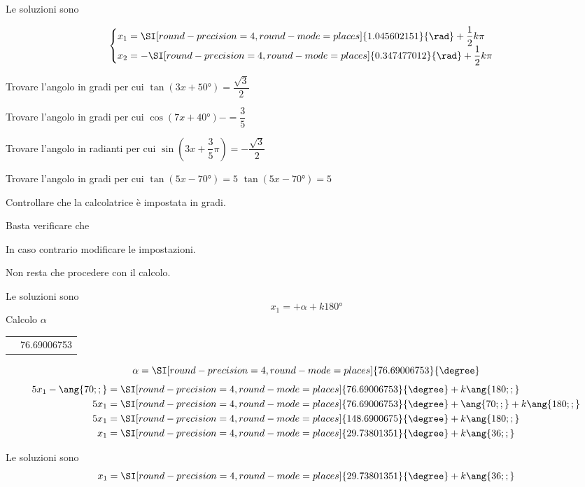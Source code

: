\begin{exercise}
  	Le soluzioni sono
  	
  	\[\begin{cases}
x_1=\SI[round-precision=\lungarrotandamento,round-mode=places]{1.045602151}{\rad}+\dfrac{1}{2}k\pi\\
x_2=-\SI[round-precision=\lungarrotandamento,round-mode=places]{0.347477012}{\rad}+\dfrac{1}{2}k\pi\\
  	\end{cases}\]
  \end{exercise}
   \begin{exercise}[no solution]
   	Trovare l'angolo in gradi per cui $\tan (3x+\ang{50;;})=\dfrac{\sqrt{3}}{2}$
   \end{exercise}
   \begin{exercise}[no solution]
   	Trovare l'angolo in gradi per cui $\cos (7x+\ang{40;;})-=\dfrac{3}{5}$
   \end{exercise}
   \begin{exercise}[no solution]
   	Trovare l'angolo in radianti per cui $\sin (3x+\dfrac{3}{5}\pi)=-\dfrac{\sqrt{3}}{2}$
   \end{exercise}
\begin{exercise}
	Trovare l'angolo in gradi per cui $\tan (5x-\ang{70;;})=5$
	\tcblower
	$\tan (5x-\ang{70;;})=5$
	
	Controllare che la calcolatrice è impostata in gradi.
	
	Basta verificare che 
	\testgradi
	
	In caso contrario modificare le impostazioni.
	
	Non resta che procedere con il calcolo.
	
	Le soluzioni sono 
	\[x_1=+\alpha+k\ang{180;;}\]
	Calcolo $\alpha$
	\begin{center}
		\begin{tabular}{ll}
			\tastoitan\tasto{\num[round-precision=1,round-mode=places]{5}}
			\tastouguale&\num[round-precision=\lungarrotandamento,round-mode=places]{76.69006753} 
		\end{tabular} 
	\end{center}
	\[\alpha=\SI[round-precision=\lungarrotandamento,round-mode=places]{76.69006753}{\degree}\]
	\begin{align*}
	5x_1-\ang{70;;}&=\SI[round-precision=\lungarrotandamento,round-mode=places]{76.69006753}{\degree}+k\ang{180;;}\\
	5x_1&=\SI[round-precision=\lungarrotandamento,round-mode=places]{76.69006753}{\degree}+\ang{70;;}+k\ang{180;;}\\
	5x_1&=\SI[round-precision=\lungarrotandamento,round-mode=places]{148.6900675}{\degree}+k\ang{180;;}\\
	x_1&=\SI[round-precision=\lungarrotandamento,round-mode=places]{29.73801351}{\degree}+k\ang{36;;}
	\end{align*}
	
	Le soluzioni sono
	\[x_1=\SI[round-precision=\lungarrotandamento,round-mode=places]{29.73801351}{\degree}+k\ang{36;;}\]
\end{exercise}

